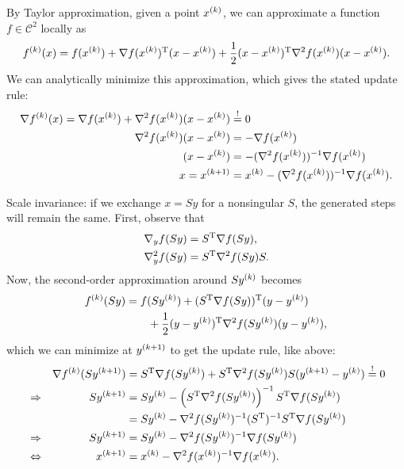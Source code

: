 \documentclass{article}
\begin{document}
By Taylor approximation, given a point \(\kth{x}\), we can approximate a function
\(f \in \mathcal{C}^2\) locally as
\begin{equation*}
  \kth{f}(x) = f(\kth{x}) + \T{\nabla f(\kth{x})}(x - \kth{x})
  + \frac{1}{2} \T{(x - \kth{x})} \nabla^2 f(\kth{x})(x - \kth{x}).
\end{equation*}
We can analytically minimize this approximation, which gives the stated update rule:
\begin{align*}
  \nabla \kth{f}(x) = \nabla f(\kth{x}) + \nabla^2 f(\kth{x})(x - \kth{x}) &\overset{!}{=} 0 \\
  \nabla^2 f(\kth{x})(x - \kth{x}) &= -\nabla f(\kth{x}) \\
  (x - \kth{x}) &= -(\nabla^2 f(\kth{x}))^{-1} \nabla f(\kth{x}) \\
  x = \kth[k+1]{x} &= \kth{x} - (\nabla^2 f(\kth{x}))^{-1} \nabla f(\kth{x}).
\end{align*}

Scale invariance: if we exchange \(x = Sy\) for a nonsingular \(S\), the generated steps will remain
the same.  First, observe that
\begin{align*}
  \nabla_y f(Sy) &= \T{S} \nabla f(Sy), \\
  \nabla_y^2 f(Sy) &= \T{S} \nabla^2 f(Sy) S.
\end{align*}
Now, the second-order approximation around \(S\kth{y}\) becomes
\begin{align*}
  \kth{f}(Sy) &= f(S\kth{y}) + \T{(\T{S} \nabla f(Sy))}(y - \kth{y}) \\
  &\qquad + \frac{1}{2} \T{(y - \kth{y})} \nabla^2 f(S\kth{y}) (y - \kth{y}),
\end{align*}
which we can minimize at \(\kth[k+1]{y}\) to get the update rule, like above:
\begin{align*}
  & &\nabla \kth{f}(S\kth[k+1]{y}) &= \T{S} \nabla f(S\kth{y}) + \T{S} \nabla^2
                                 f(S\kth{y})S(\kth[k+1]{y}
                                 - \kth{y}) \overset{!}{=} 0 \\
  &\Rightarrow & S\kth[k+1]{y} &= S\kth{y} - \left( \T{S}\nabla^2 f(S\kth{y}) \right)^{-1} \T{S}
                                  \nabla f(S\kth{y}) \\
  &\phantom{\Rightarrow} & &= S\kth{y} - \nabla^2 f(S\kth{y})^{-1} (\T{S})^{-1}
                                 \T{S} \nabla f(S\kth{y}) \\
  &\Rightarrow & S\kth[k+1]{y} &= S\kth{y} - \nabla^2 f(S\kth{y})^{-1} \nabla f(S\kth{y}) \\
  &\Leftrightarrow & \kth[k+1]{x} &= \kth{x} - \nabla^2 f(\kth{x})^{-1} \nabla f(\kth{x}).
\end{align*}
\end{document}
